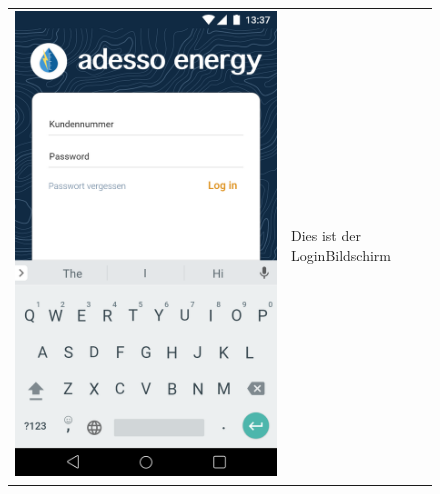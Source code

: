 \begin{figure}[h]
\begin{tabularx}{\textwidth}{X | X}
	\includegraphics[scale = 0.22]{img/AndroidMockup/login} & Dies ist der LoginBildschirm \\ 
\end{tabularx}
\end{figure}



